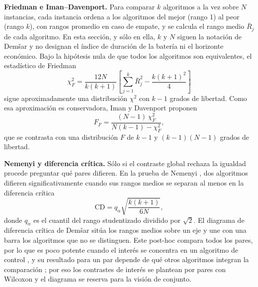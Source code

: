 \textbf{Friedman e Iman--Davenport.} Para comparar $k$ algoritmos a la vez sobre $N$ instancias, cada instancia ordena a los algoritmos del mejor (rango 1) al peor (rango $k$), con rangos promedio en caso de empate, y se calcula el rango medio $\bar{R}_j$ de cada algoritmo. En esta sección, y sólo en ella, $k$ y $N$ siguen la notación de Demšar \cite{Demsar2006Statistical} y no designan el índice de duración de la batería ni el horizonte económico. Bajo la hipótesis nula de que todos los algoritmos son equivalentes, el estadístico de Friedman \cite{Friedman1937}
\begin{equation}
\chi^2_F=\frac{12N}{k(k+1)}\left[\sum_{j=1}^{k}\bar{R}_j^2-\frac{k(k+1)^2}{4}\right]
\label{eq:friedman}
\end{equation}
sigue aproximadamente una distribución $\chi^2$ con $k-1$ grados de libertad. Como esa aproximación es conservadora, Iman y Davenport \cite{Iman1980Approximations} proponen
\begin{equation}
F_F=\frac{(N-1)\,\chi^2_F}{N(k-1)-\chi^2_F},
\label{eq:iman_davenport}
\end{equation}
que se contrasta con una distribución $F$ de $k-1$ y $(k-1)(N-1)$ grados de libertad.

\textbf{Nemenyi y diferencia crítica.} Sólo si el contraste global rechaza la igualdad procede preguntar qué pares difieren. En la prueba de Nemenyi \cite{Nemenyi1963}, dos algoritmos difieren significativamente cuando sus rangos medios se separan al menos en la diferencia crítica
\begin{equation}
\mathrm{CD}=q_\alpha\sqrt{\frac{k(k+1)}{6N}},
\label{eq:cd}
\end{equation}
donde $q_\alpha$ es el cuantil del rango studentizado dividido por $\sqrt{2}$. El diagrama de diferencia crítica de Demšar \cite{Demsar2006Statistical} sitúa los rangos medios sobre un eje y une con una barra los algoritmos que no se distinguen. Este post-hoc compara todos los pares, por lo que es poco potente cuando el interés se concentra en un algoritmo de control \cite{Garcia2008Extension}, y su resultado para un par depende de qué otros algoritmos integran la comparación \cite{Benavoli2016MeanRanks}; por eso los contrastes de interés se plantean por pares con Wilcoxon y el diagrama se reserva para la visión de conjunto.

